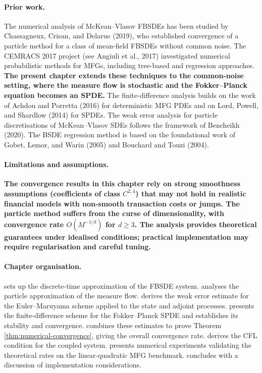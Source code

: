 \paragraph{Prior work.} The numerical analysis of McKean--Vlasov FBSDEs has been
studied by Chassagneux, Crisan, and Delarue (2019), who established convergence of a
particle method for a class of mean-field FBSDEs without common noise. The CEMRACS
2017 project (see Angiuli et al., 2017) investigated numerical probabilistic methods
for MFGs, including tree-based and regression approaches. \textbf{The present chapter
extends these techniques to the common-noise setting, where the measure flow is
stochastic and the Fokker--Planck equation becomes an SPDE.} The finite-difference
analysis builds on the work of Achdou and Porretta (2016) for deterministic MFG PDEs
and on Lord, Powell, and Shardlow (2014) for SPDEs. The weak error analysis for
particle discretisations of McKean--Vlasov SDEs follows the framework of Bencheikh
(2020). The BSDE regression method is based on the foundational work of Gobet, Lemor,
and Warin (2005) and Bouchard and Touzi (2004).

\paragraph{Limitations and assumptions.} \textbf{The convergence results in this
chapter rely on strong smoothness assumptions (coefficients of class $C^{2,4}$) that
may not hold in realistic financial models with non-smooth transaction costs or jumps.
The particle method suffers from the curse of dimensionality, with convergence rate
$O(M^{-1/d})$ for $d \geq 3$. The analysis provides theoretical guarantees under
idealised conditions; practical implementation may require regularisation and careful
tuning.}

\paragraph{Chapter organisation.}  sets up the
discrete-time approximation of the FBSDE system.  analyses the
particle approximation of the measure flow.  derives the weak
error estimate for the Euler--Maruyama scheme applied to the state and adjoint
processes.  presents the finite-difference scheme for the
Fokker--Planck SPDE and establishes its stability and convergence.
 combines these estimates to prove Theorem
\ref{thm:numerical-convergence}, giving the overall convergence rate.
 derives the CFL condition for the coupled system.
 presents numerical experiments validating the theoretical
rates on the linear-quadratic MFG benchmark.  concludes with a
discussion of implementation considerations.


